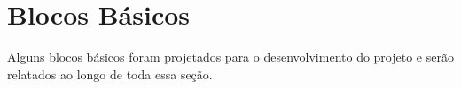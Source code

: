 \section{Blocos B\'asicos}
Alguns blocos b\'asicos foram projetados para o desenvolvimento do projeto e ser\~ao relatados ao longo de toda essa se{\c c}\~ao.


%



